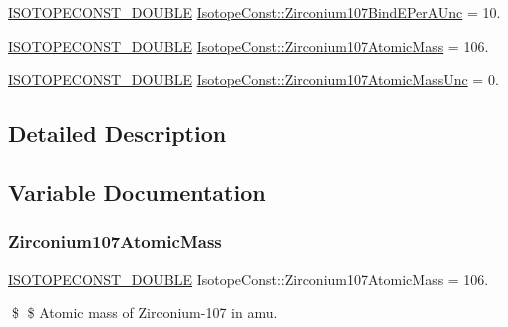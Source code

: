 \begin{DoxyCompactItemize}
\mbox{\hyperlink{group___isotope_const-_macros_ga8f45a7272ce02c0b4c65c44636ed719a}{I\+S\+O\+T\+O\+P\+E\+C\+O\+N\+S\+T\+\_\+\+D\+O\+U\+B\+LE}} \mbox{\hyperlink{group___isotope_const-_zirconium-_zr107_ga01aa470584e800893816d2c3a6321507}{Isotope\+Const\+::\+Zirconium107\+Bind\+E\+Per\+A\+Unc}} = 10.
\item 
\mbox{\hyperlink{group___isotope_const-_macros_ga8f45a7272ce02c0b4c65c44636ed719a}{I\+S\+O\+T\+O\+P\+E\+C\+O\+N\+S\+T\+\_\+\+D\+O\+U\+B\+LE}} \mbox{\hyperlink{group___isotope_const-_zirconium-_zr107_ga76d8e220deea46642aa6fc4458d8a478}{Isotope\+Const\+::\+Zirconium107\+Atomic\+Mass}} = 106.
\item 
\mbox{\hyperlink{group___isotope_const-_macros_ga8f45a7272ce02c0b4c65c44636ed719a}{I\+S\+O\+T\+O\+P\+E\+C\+O\+N\+S\+T\+\_\+\+D\+O\+U\+B\+LE}} \mbox{\hyperlink{group___isotope_const-_zirconium-_zr107_gac215af119820fd2c077ea23c4737b786}{Isotope\+Const\+::\+Zirconium107\+Atomic\+Mass\+Unc}} = 0.
\end{DoxyCompactItemize}


\subsection{Detailed Description}


\subsection{Variable Documentation}
\mbox{\label{group___isotope_const-_zirconium-_zr107_ga76d8e220deea46642aa6fc4458d8a478}} 
\subsubsection{\texorpdfstring{Zirconium107\+Atomic\+Mass}{Zirconium107AtomicMass}}
{\footnotesize\ttfamily \mbox{\hyperlink{group___isotope_const-_macros_ga8f45a7272ce02c0b4c65c44636ed719a}{I\+S\+O\+T\+O\+P\+E\+C\+O\+N\+S\+T\+\_\+\+D\+O\+U\+B\+LE}} Isotope\+Const\+::\+Zirconium107\+Atomic\+Mass = 106.}

\$ \$ Atomic mass of Zirconium-\/107 in amu. \mbox{\label{group___isotope_const-_zirconium-_zr107_gac215af119820fd2c077ea23c4737b786}} 
